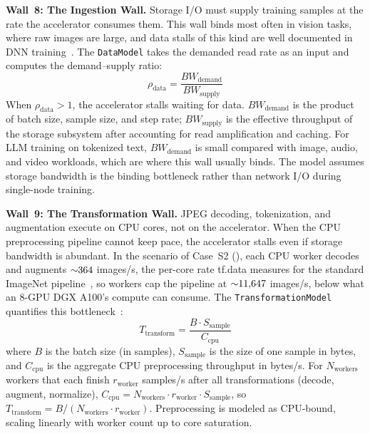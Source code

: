 \documentclass[10pt,twocolumn]{article}
\begin{document}
\textbf{Wall~8: The Ingestion Wall.} Storage I/O must supply training samples at the rate the accelerator consumes them. This wall binds most often in vision tasks, where raw images are large, and data stalls of this kind are well documented in DNN training~\citep{mohan2021}. The \texttt{DataModel} takes the demanded read rate as an input and computes the demand--supply ratio:
\begin{equation}
\label{eq:ingestion}
\rho_{\text{data}} = \frac{BW_{\text{demand}}}{BW_{\text{supply}}}
\end{equation}
When $\rho_{\text{data}} > 1$, the accelerator stalls waiting for data. $BW_{\text{demand}}$ is the product of batch size, sample size, and step rate; $BW_{\text{supply}}$ is the effective throughput of the storage subsystem after accounting for read amplification and caching. For LLM training on tokenized text, $BW_{\text{demand}}$ is small compared with image, audio, and video workloads, which are where this wall usually binds. The model assumes storage bandwidth is the binding bottleneck rather than network I/O during single-node training.

\textbf{Wall~9: The Transformation Wall.} JPEG decoding, tokenization, and augmentation execute on CPU cores, not on the accelerator. When the CPU preprocessing pipeline cannot keep pace, the accelerator stalls even if storage bandwidth is abundant. In the scenario of Case~S2 (), each CPU worker decodes and augments ${\sim}364$ images/s, the per-core rate tf.data measures for the standard ImageNet pipeline~\citep{murray2021tf}, so \CaseSTwoWorkers{} workers cap the pipeline at ${\sim}11{,}647$ images/s, below what an 8-GPU DGX A100's compute can consume. The \texttt{TransformationModel} quantifies this bottleneck~\citep{murray2021tf}:
\begin{equation}
\label{eq:transform}
T_{\text{transform}} = \frac{B \cdot S_{\text{sample}}}{C_{\text{cpu}}}
\end{equation}
where $B$ is the batch size (in samples), $S_{\text{sample}}$ is the size of one sample in bytes, and $C_{\text{cpu}}$ is the aggregate CPU preprocessing throughput in bytes/s. For $N_{\text{workers}}$ workers that each finish $r_{\text{worker}}$ samples/s after all transformations (decode, augment, normalize), $C_{\text{cpu}} = N_{\text{workers}} \cdot r_{\text{worker}} \cdot S_{\text{sample}}$, so $T_{\text{transform}} = B / (N_{\text{workers}} \cdot r_{\text{worker}})$. Preprocessing is modeled as CPU-bound, scaling linearly with worker count up to core saturation.
\end{document}
